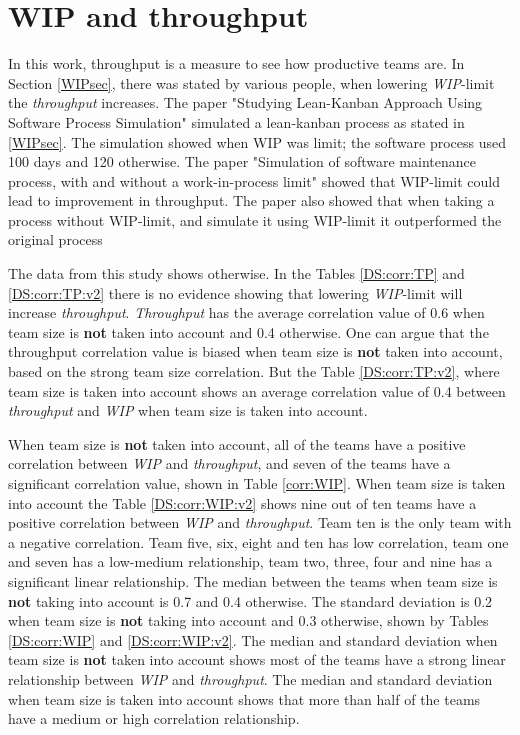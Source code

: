 \documentclass[UKenglish]{ifimaster}  %
\begin{document}
\section{WIP and throughput} 
\vspace{-0.5em}
In this work, throughput is a measure to see how productive teams are. In Section \ref{WIPsec}, there was stated by various people, when lowering \textit{WIP}-limit the \textit{throughput} increases. The paper "Studying Lean-Kanban Approach Using Software Process Simulation" \parencite{DavidAnderson} simulated a  lean-kanban process as stated in \ref{WIPsec}. The simulation showed when WIP was limit; the software process used 100 days and 120 otherwise. The paper "Simulation of software maintenance process, with and without a work-in-process limit" \parencite{SMR:SMR1599} showed that WIP-limit could lead to improvement in throughput. The paper also showed that when taking a process without WIP-limit, and simulate it using WIP-limit it outperformed the original process


 The data from this study shows otherwise. In the Tables \ref{DS:corr:TP} and \ref{DS:corr:TP:v2} there is no evidence showing that lowering \textit{WIP}-limit will increase \textit{throughput}. \textit{Throughput} has the average correlation value of 0.6 when team size is \textbf{not} taken into account and 0.4 otherwise. One can argue that the throughput correlation value is biased when team size is \textbf{not} taken into account, based on the strong team size correlation. But the Table \ref{DS:corr:TP:v2}, where team size is taken into account shows an average correlation value of 0.4 between \textit{throughput} and \textit{WIP} when team size is taken into account.

When team size is \textbf{not} taken into account,  all of the teams have a positive correlation between \textit{WIP} and \textit{throughput}, and seven of the teams have a significant correlation value, shown in Table \ref{corr:WIP}.  When team size is taken into account the Table \ref{DS:corr:WIP:v2}  shows nine out of ten teams have a positive correlation between \textit{WIP} and \textit{throughput}. Team ten is the only team with a negative correlation.  Team five, six, eight and ten has low correlation, team one and seven has a low-medium relationship, team two, three, four and nine has a significant linear relationship. The median between the teams when team size is \textbf{not} taking into account is 0.7 and 0.4 otherwise. The standard deviation is 0.2 when team size is \textbf{not} taking into account and 0.3 otherwise, shown by Tables \ref{DS:corr:WIP} and \ref{DS:corr:WIP:v2}.  The median and standard deviation when team size is \textbf{not} taken into account shows most of the teams have a strong linear relationship between \textit{WIP} and \textit{throughput}. The median and standard deviation when team size is taken into account shows that more than half of the teams have a medium or high correlation relationship.
\end{document}
